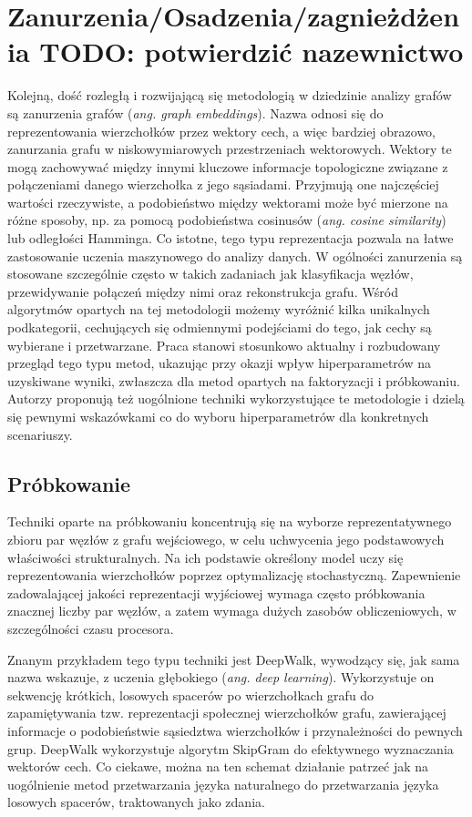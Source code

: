 \section{Zanurzenia/Osadzenia/zagnieżdżenia TODO: potwierdzić nazewnictwo}
    Kolejną, dość rozległą i rozwijającą się metodologią w dziedzinie analizy grafów są zanurzenia grafów (\emph{ang. graph embeddings}). Nazwa odnosi się do reprezentowania wierzchołków przez wektory cech, a więc bardziej obrazowo, zanurzania grafu w niskowymiarowych przestrzeniach wektorowych. Wektory te mogą zachowywać między innymi kluczowe informacje topologiczne związane z połączeniami danego wierzchołka z jego sąsiadami. Przyjmują one najczęściej wartości rzeczywiste, a podobieństwo między wektorami może być mierzone na różne sposoby, np.  za pomocą podobieństwa cosinusów (\emph{ang. cosine similarity}) lub odległości Hamminga\cite{Lian_Zheng_Zheng_Ge_Cao_Tsang_Xie_2018}. Co istotne, tego typu reprezentacja pozwala na łatwe zastosowanie uczenia maszynowego do analizy danych. W ogólności zanurzenia są stosowane szczególnie często w takich zadaniach jak klasyfikacja węzłów, przewidywanie połączeń między nimi oraz rekonstrukcja grafu. Wśród algorytmów opartych na tej metodologii możemy wyróżnić kilka unikalnych podkategorii, cechujących się odmiennymi podejściami do tego, jak cechy są wybierane i przetwarzane. Praca \cite{Yang_Qu_Hussein_Rosso_Cudré-Mauroux_Liu_2023} stanowi stosunkowo aktualny i rozbudowany przegląd tego typu metod, ukazując przy okazji wpływ hiperparametrów na uzyskiwane wyniki, zwłaszcza dla metod opartych na faktoryzacji i próbkowaniu. Autorzy proponują też uogólnione techniki wykorzystujące te metodologie i dzielą się pewnymi wskazówkami co do wyboru hiperparametrów dla konkretnych scenariuszy. 

    \subsection{Próbkowanie}
        Techniki oparte na próbkowaniu koncentrują się na wyborze reprezentatywnego zbioru par węzłów z grafu wejściowego, w celu uchwycenia jego podstawowych właściwości strukturalnych. Na ich podstawie określony model uczy się reprezentowania wierzchołków poprzez optymalizację stochastyczną. Zapewnienie zadowalającej jakości reprezentacji wyjściowej wymaga często próbkowania znacznej liczby par węzłów, a zatem wymaga dużych zasobów obliczeniowych, w szczególności czasu procesora.
            
        Znanym przykładem tego typu techniki jest DeepWalk\cite{Perozzi_Al-Rfou_Skiena_2014}, wywodzący się, jak sama nazwa wskazuje, z uczenia głębokiego (\emph{ang. deep learning}). Wykorzystuje on sekwencję krótkich, losowych spacerów po wierzchołkach grafu do zapamiętywania tzw. reprezentacji społecznej wierzchołków grafu, zawierającej informacje o podobieństwie sąsiedztwa wierzchołków i przynależności do pewnych grup. DeepWalk wykorzystuje algorytm SkipGram do efektywnego wyznaczania wektorów cech. Co ciekawe, można na ten schemat działanie patrzeć jak na uogólnienie metod przetwarzania języka naturalnego do przetwarzania języka losowych spacerów, traktowanych jako zdania. 
        
